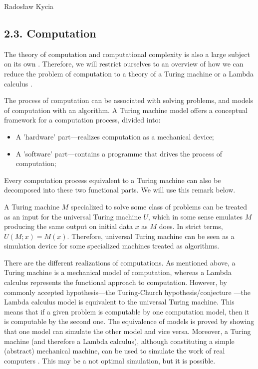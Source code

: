\begin{artengenv}{Radosław Kycia}
\subsection{2.3. Computation}
The theory of computation and computational complexity is also a large subject on its own \parencite{HopcroftUllman}. Therefore, we will restrict ourselves to an overview of how we can reduce the problem of computation to a theory of a Turing machine or a Lambda calculus \parencite{LambdaCalculus, RosettaStone_Baez, HopcroftUllman}.

The process of computation can be associated with solving problems, and models of computation with an algorithm. A Turing machine model offers a conceptual framework for a computation process, divided into:
\begin{itemize}
 \item {A 'hardware' part---realizes computation as a mechanical device;}
 \item {A 'software' part---contains a programme that drives the process of computation;}
\end{itemize}
Every computation process equivalent to a Turing machine can also be decomposed into these two functional parts. We will use this remark below.

A Turing machine $M$ specialized to solve some class of problems can be treated as an input for the universal Turing machine $U$, which in some sense emulates $M$ producing the same output on initial data $x$ as $M$ does. In strict terms, $U(M;x) =M(x)$. Therefore, universal Turing machine can be seen as a simulation device for some specialized machines treated as algorithms. 

There are the different realizations of computations. As mentioned above, a Turing machine is a mechanical model of computation, whereas a Lambda calculus represents the functional approach to computation. However, by commonly accepted hypothesis---the Turing-Church hypothesis/conjecture \parencite{HopcroftUllman}---the Lambda calculus model is equivalent to the universal Turing machine. This means that if a given problem is computable by one computation model, then it is computable by the second one. The equivalence of models is proved by showing that one model can simulate the other model and vice versa. Moreover, a Turing machine (and therefore a Lambda calculus), although constituting a simple (abstract) mechanical machine, can be used to simulate the work of real computers \parencite{HopcroftUllman}. This may be a not optimal simulation, but it is possible. 



\end{artengenv}
